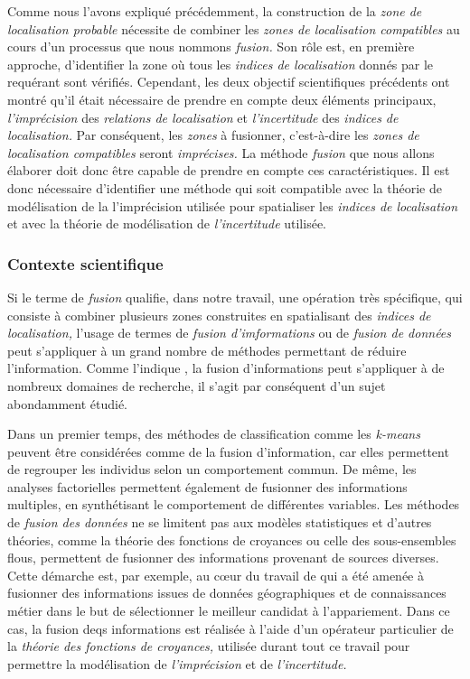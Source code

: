 Comme nous l'avons expliqué précédemment, la construction de la
\emph{zone de localisation probable} nécessite de combiner les
\emph{zones de localisation compatibles} au cours d'un processus que
nous nommons \emph{fusion.} Son rôle est, en première approche,
d'identifier la zone où tous les \emph{indices de localisation} donnés
par le requérant sont vérifiés. Cependant, les deux objectif
scientifiques précédents ont montré qu'il était nécessaire de prendre
en compte deux éléments principaux, \emph{l'imprécision} des
\emph{relations de localisation} et \emph{l'incertitude} des
\emph{indices de localisation.} Par conséquent, les \emph{zones} à
fusionner, c'est-à-dire les \emph{zones de localisation compatibles}
seront \emph{imprécises.} La méthode \emph{fusion} que nous allons
élaborer doit donc être capable de prendre en compte ces
caractéristiques. Il est donc nécessaire d'identifier une méthode qui
soit compatible avec la théorie de modélisation de la l'imprécision
utilisée pour spatialiser les \emph{indices de localisation} et avec
la théorie de modélisation de \emph{l'incertitude} utilisée.

\subsubsection{Contexte scientifique}

Si le terme de \emph{fusion} qualifie, dans notre travail, une
opération très spécifique, qui consiste à combiner plusieurs zones
construites en spatialisant des \emph{indices de localisation,}
l'usage de termes de \emph{fusion d'imformations} ou de \emph{fusion
  de données} peut s'appliquer à un grand nombre de méthodes
permettant de réduire l'information. Comme l'indique
\textcite{Castanedo2013}, la fusion d'informations peut s'appliquer à
de nombreux domaines de recherche, il s'agit par conséquent d'un sujet
abondamment étudié.

Dans un premier temps, des méthodes de classification comme les
\emph{k-means} peuvent être considérées comme de la fusion
d’information, car elles permettent de regrouper les individus selon
un comportement commun. De même, les analyses factorielles permettent
également de fusionner des informations multiples, en synthétisant le
comportement de différentes variables. Les méthodes de \emph{fusion
  des données} ne se limitent pas aux modèles statistiques et d'autres
théories, comme la théorie des fonctions de croyances ou celle des
sous-ensembles flous, permettent de fusionner des informations
provenant de sources diverses. Cette démarche est, par exemple, au
cœur du travail de \textcite{Olteanu2008} qui a été amenée à fusionner
des informations issues de données géographiques et de connaissances
métier dans le but de sélectionner le meilleur candidat à
l’appariement. Dans ce cas, la fusion deqs informations est réalisée à
l'aide d'un opérateur particulier de la \emph{théorie des fonctions de
  croyances,} utilisée durant tout ce travail pour permettre la
modélisation de \emph{l'imprécision} et de \emph{l'incertitude.}

